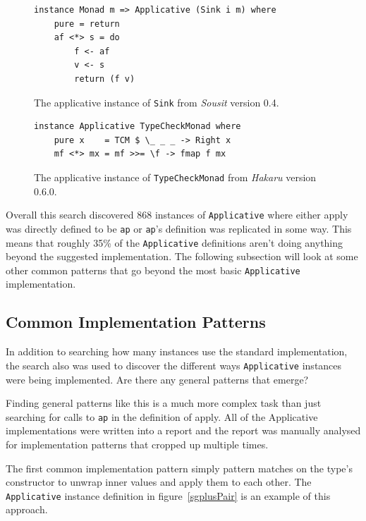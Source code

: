 \begin{figure}[t]
\begin{lstlisting}
instance Monad m => Applicative (Sink i m) where
    pure = return
    af <*> s = do 
        f <- af
        v <- s
        return (f v)
\end{lstlisting}
\caption{The applicative instance of \texttt{Sink} from \textit{Sousit} version 0.4.}
\label{sousitAp}
\end{figure}

\begin{figure}[t]
\begin{lstlisting}
instance Applicative TypeCheckMonad where
    pure x    = TCM $ \_ _ _ -> Right x
    mf <*> mx = mf >>= \f -> fmap f mx
\end{lstlisting}
\caption{The applicative instance of \texttt{TypeCheckMonad} from \textit{Hakaru} version 0.6.0.}
\label{appWithBind}
\end{figure}

Overall this search discovered 868 instances of \texttt{Applicative} where either apply was directly defined to be \texttt{ap} or \texttt{ap}'s definition was replicated in some way. This means that roughly 35\% of the \texttt{Applicative} definitions aren't doing anything beyond the suggested implementation. The following subsection will look at some other common patterns that go beyond the most basic \texttt{Applicative} implementation.

\subsection{Common Implementation Patterns}

In addition to searching how many instances use the standard implementation, the search also was used to discover the different ways \texttt{Applicative} instances were being implemented. Are there any general patterns that emerge?

Finding general patterns like this is a much more complex task than just searching for calls to \texttt{ap} in the definition of apply. All of the Applicative implementations were written into a report and the report was manually analysed for implementation patterns that cropped up multiple times. 

The first common implementation pattern simply pattern matches on the type's constructor to unwrap inner values and apply them to each other. The \texttt{Applicative} instance definition in figure~\ref{sgplusPair} is an example of this approach. 

